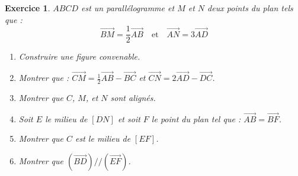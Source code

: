 \documentclass[12pt,a4paper]{article}
\theoremstyle{mystyle}
\newtheorem{exo}{Exercice}
\begin{document}
\begin{multicols*}{2}
\begin{exo}
    $ABCD$ est un parallélogramme et $M$ et $N$ deux points du plan tels que :
\[
\overrightarrow{BM} = \frac{1}{2}\overrightarrow{AB} \quad \text{et} \quad \overrightarrow{AN} = 3\overrightarrow{AD}
\]
\begin{enumerate}
    \item Construire une figure convenable.
    \item Montrer que : $\overrightarrow{CM} = \frac{1}{2}\overrightarrow{AB} - \overrightarrow{BC}$ et $\overrightarrow{CN} = 2\overrightarrow{AD} - \overrightarrow{DC}$.
    \item Montrer que $C$, $M$, et $N$ sont alignés.
    \item Soit $E$ le milieu de $[DN]$ et soit $F$ le point du plan tel que : $\overrightarrow{AB} = \overrightarrow{BF}$.
    \item Montrer que $C$ est le milieu de $[EF]$.
    \item Montrer que $ (\overrightarrow{BD})//(\overrightarrow{EF}) $.
\end{enumerate}

\end{exo}


\end{multicols*}
\end{document}
